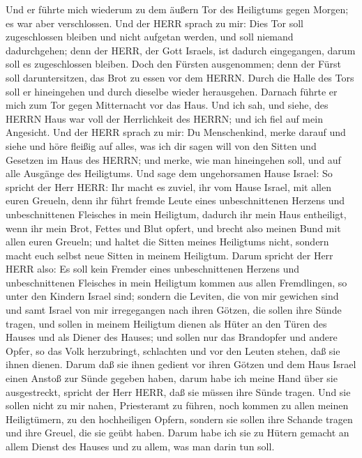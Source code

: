  Und er führte mich wiederum zu dem äußern Tor des
Heiligtums gegen Morgen; es war aber verschlossen.  Und der
HERR sprach zu mir: Dies Tor soll zugeschlossen bleiben und nicht
aufgetan werden, und soll niemand dadurchgehen; denn der HERR, der Gott
Israels, ist dadurch eingegangen, darum soll es zugeschlossen bleiben.
 Doch den Fürsten ausgenommen; denn der Fürst soll
daruntersitzen, das Brot zu essen vor dem HERRN. Durch die Halle des
Tors soll er hineingehen und durch dieselbe wieder herausgehen.
 Darnach führte er mich zum Tor gegen Mitternacht vor das
Haus. Und ich sah, und siehe, des HERRN Haus war voll der Herrlichkeit
des HERRN; und ich fiel auf mein Angesicht.  Und der HERR
sprach zu mir: Du Menschenkind, merke darauf und siehe und höre fleißig
auf alles, was ich dir sagen will von den Sitten und Gesetzen im Haus
des HERRN; und merke, wie man hineingehen soll, und auf alle Ausgänge
des Heiligtums.  Und sage dem ungehorsamen Hause Israel: So
spricht der Herr HERR: Ihr macht es zuviel, ihr vom Hause Israel, mit
allen euren Greueln,  denn ihr führt fremde Leute eines
unbeschnittenen Herzens und unbeschnittenen Fleisches in mein Heiligtum,
dadurch ihr mein Haus entheiligt, wenn ihr mein Brot, Fettes und Blut
opfert, und brecht also meinen Bund mit allen euren Greueln;
 und haltet die Sitten meines Heiligtums nicht, sondern
macht euch selbst neue Sitten in meinem Heiligtum.  Darum
spricht der Herr HERR also: Es soll kein Fremder eines unbeschnittenen
Herzens und unbeschnittenen Fleisches in mein Heiligtum kommen aus allen
Fremdlingen, so unter den Kindern Israel sind;  sondern die
Leviten, die von mir gewichen sind und samt Israel von mir irregegangen
nach ihren Götzen, die sollen ihre Sünde tragen,  und
sollen in meinem Heiligtum dienen als Hüter an den Türen des Hauses und
als Diener des Hauses; und sollen nur das Brandopfer und andere Opfer,
so das Volk herzubringt, schlachten und vor den Leuten stehen, daß sie
ihnen dienen.  Darum daß sie ihnen gedient vor ihren Götzen
und dem Haus Israel einen Anstoß zur Sünde gegeben haben, darum habe ich
meine Hand über sie ausgestreckt, spricht der Herr HERR, daß sie müssen
ihre Sünde tragen.  Und sie sollen nicht zu mir nahen,
Priesteramt zu führen, noch kommen zu allen meinen Heiligtümern, zu den
hochheiligen Opfern, sondern sie sollen ihre Schande tragen und ihre
Greuel, die sie geübt haben.  Darum habe ich sie zu Hütern
gemacht an allem Dienst des Hauses und zu allem, was man darin tun soll.
